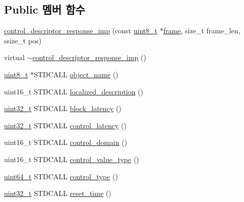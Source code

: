 \subsection*{Public 멤버 함수}
\begin{DoxyCompactItemize}
\item 
\hyperlink{classavdecc__lib_1_1control__descriptor__response__imp_a61771939b690da90ec17f677050fb5ca}{control\+\_\+descriptor\+\_\+response\+\_\+imp} (const \hyperlink{stdint_8h_aba7bc1797add20fe3efdf37ced1182c5}{uint8\+\_\+t} $\ast$\hyperlink{gst__avb__playbin_8c_ac8e710e0b5e994c0545d75d69868c6f0}{frame}, size\+\_\+t frame\+\_\+len, ssize\+\_\+t pos)
\item 
virtual \hyperlink{classavdecc__lib_1_1control__descriptor__response__imp_a5325c925f90856408e3a792d627d61b4}{$\sim$control\+\_\+descriptor\+\_\+response\+\_\+imp} ()
\item 
\hyperlink{stdint_8h_aba7bc1797add20fe3efdf37ced1182c5}{uint8\+\_\+t} $\ast$S\+T\+D\+C\+A\+LL \hyperlink{classavdecc__lib_1_1control__descriptor__response__imp_a15837e3eb254ad44812cb766ae8cd53c}{object\+\_\+name} ()
\item 
uint16\+\_\+t S\+T\+D\+C\+A\+LL \hyperlink{classavdecc__lib_1_1control__descriptor__response__imp_aa94307532fbb37e2f986fee8fec79373}{localized\+\_\+description} ()
\item 
\hyperlink{parse_8c_a6eb1e68cc391dd753bc8ce896dbb8315}{uint32\+\_\+t} S\+T\+D\+C\+A\+LL \hyperlink{classavdecc__lib_1_1control__descriptor__response__imp_af73005227357cf68983ec8157b6c0ad9}{block\+\_\+latency} ()
\item 
\hyperlink{parse_8c_a6eb1e68cc391dd753bc8ce896dbb8315}{uint32\+\_\+t} S\+T\+D\+C\+A\+LL \hyperlink{classavdecc__lib_1_1control__descriptor__response__imp_ae1104ce2eb5eb90c693e568157ce2358}{control\+\_\+latency} ()
\item 
uint16\+\_\+t S\+T\+D\+C\+A\+LL \hyperlink{classavdecc__lib_1_1control__descriptor__response__imp_af2e4fc5e7842691d29faac49296ddcf6}{control\+\_\+domain} ()
\item 
uint16\+\_\+t S\+T\+D\+C\+A\+LL \hyperlink{classavdecc__lib_1_1control__descriptor__response__imp_a11d5e7c0cffae0dec86daa44653f9bd9}{control\+\_\+value\+\_\+type} ()
\item 
\hyperlink{parse_8c_aec6fcb673ff035718c238c8c9d544c47}{uint64\+\_\+t} S\+T\+D\+C\+A\+LL \hyperlink{classavdecc__lib_1_1control__descriptor__response__imp_afbaadc05125e0f7bd40999c16d4b3003}{control\+\_\+type} ()
\item 
\hyperlink{parse_8c_a6eb1e68cc391dd753bc8ce896dbb8315}{uint32\+\_\+t} S\+T\+D\+C\+A\+LL \hyperlink{classavdecc__lib_1_1control__descriptor__response__imp_ad6613eb6800c1cd0815b63809b856c42}{reset\+\_\+time} ()

\end{DoxyCompactItemize}
